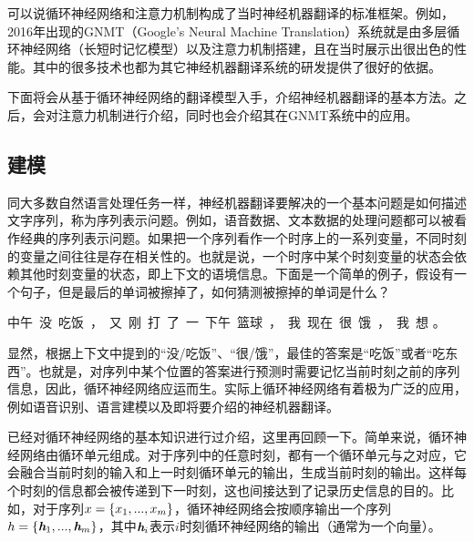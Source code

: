 \parinterval 可以说循环神经网络和注意力机制构成了当时神经机器翻译的标准框架。例如，2016年出现的GNMT（Google's Neural Machine Translation）系统就是由多层循环神经网络（长短时记忆模型）以及注意力机制搭建，且在当时展示出很出色的性能。其中的很多技术也都为其它神经机器翻译系统的研发提供了很好的依据。

\parinterval 下面将会从基于循环神经网络的翻译模型入手，介绍神经机器翻译的基本方法。之后，会对注意力机制进行介绍，同时也会介绍其在GNMT系统中的应用。

\subsection{建模}
\label{sec:10.3.1}

\parinterval 同大多数自然语言处理任务一样，神经机器翻译要解决的一个基本问题是如何描述文字序列，称为序列表示问题。例如，语音数据、文本数据的处理问题都可以被看作经典的序列表示问题。如果把一个序列看作一个时序上的一系列变量，不同时刻的变量之间往往是存在相关性的。也就是说，一个时序中某个时刻变量的状态会依赖其他时刻变量的状态，即上下文的语境信息。下面是一个简单的例子，假设有一个句子，但是最后的单词被擦掉了，如何猜测被擦掉的单词是什么？

\vspace{0.8em}
\centerline{中午\ 没\ 吃饭\ ，\ 又\ 刚\ 打\ 了\ 一\ 下午\ 篮球\ ，\ 我\ 现在\ 很\ 饿\ ，\ 我\ 想\underline{\quad \quad \quad} 。}
\vspace{0.8em}

\parinterval 显然，根据上下文中提到的“没/吃饭”、“很/饿”，最佳的答案是“吃饭”或者“吃东西”。也就是，对序列中某个位置的答案进行预测时需要记忆当前时刻之前的序列信息，因此，循环神经网络应运而生。实际上循环神经网络有着极为广泛的应用，例如语音识别、语言建模以及即将要介绍的神经机器翻译。

\parinterval {\chapternine}已经对循环神经网络的基本知识进行过介绍，这里再回顾一下。简单来说，循环神经网络由循环单元组成。对于序列中的任意时刻，都有一个循环单元与之对应，它会融合当前时刻的输入和上一时刻循环单元的输出，生成当前时刻的输出。这样每个时刻的信息都会被传递到下一时刻，这也间接达到了记录历史信息的目的。比如，对于序列${x}=\{x_1,..., x_m\}$，循环神经网络会按顺序输出一个序列${h}=\{ \textbf{\em h}_1,..., \textbf{\em h}_m \}$，其中$\textbf{\em h}_i$表示$i$时刻循环神经网络的输出（通常为一个向量）。

